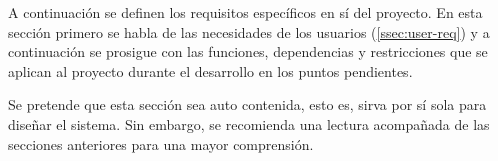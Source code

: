 A continuación se definen los requisitos específicos en sí del proyecto. En esta
sección primero se habla de las necesidades de los usuarios (\ref{ssec:user-req})
y a continuación se prosigue con las funciones, dependencias y restricciones
que se aplican al proyecto durante el desarrollo en los puntos pendientes.

Se pretende que esta sección sea auto contenida, esto es, sirva por sí sola para
diseñar el sistema. Sin embargo, se recomienda una lectura acompañada de las
secciones anteriores para una mayor comprensión.